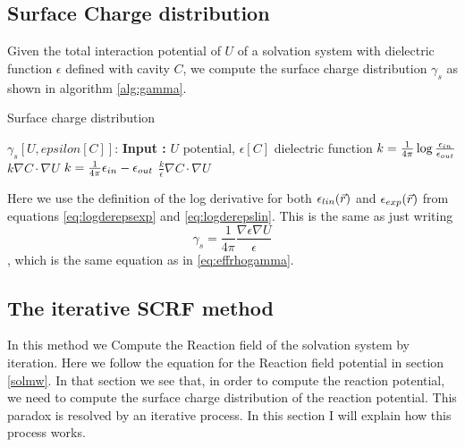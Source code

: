 \documentclass[../master_thesis.tex]{subfiles}
\begin{document}
\subsection{Surface Charge distribution}
Given the total interaction potential of $U$ of a solvation system with
dielectric function $\epsilon$ defined with cavity $C$, we compute the surface charge distribution
$\gamma_s$ as shown in algorithm \ref{alg:gamma}.
\begin{algorithm}
  \caption{Surface charge distribution}\label{alg:gamma}
  \begin{algorithmic}
    \STATE $\gamma_s[U, epsilon[C]]$:
    \STATE \textbf{Input :} $U$ potential, $\epsilon[C]$ dielectric function
      \STATE $k = \frac{1}{4\pi}\log\frac{\epsilon_{in}}{\epsilon_{out}}$
      \RETURN $k \nabla C \cdot \nabla U$
      \STATE $k = \frac{1}{4\pi}\epsilon_{in}-\epsilon_{out}$
      \RETURN $\frac{k}{\epsilon} \nabla C \cdot \nabla U$
    \ENDIF
  \end{algorithmic}
\end{algorithm}

Here we use the definition of the log derivative for both $\epsilon_{lin}(\vec{r})$ and $\epsilon_{exp}(\vec{r})$
from equations \ref{eq:logderepsexp} and \ref{eq:logderepslin}. This is the same
as just writing $$\gamma_s = \frac{1}{4\pi}\frac{\nabla\epsilon\nabla U}{\epsilon}$$,
which is the same equation as in \ref{eq:effrhogamma}.

\subsection{The iterative \ac{SCRF} method}
In this method we Compute the Reaction field of the solvation system by iteration.
Here we follow the equation for the Reaction field potential in section \ref{solmw}.
In that section we see that, in order to compute the reaction potential, we need
to compute the surface charge distribution of the reaction potential. This
paradox is resolved by an iterative process. In this section I will explain how
this process works.
\end{document}
